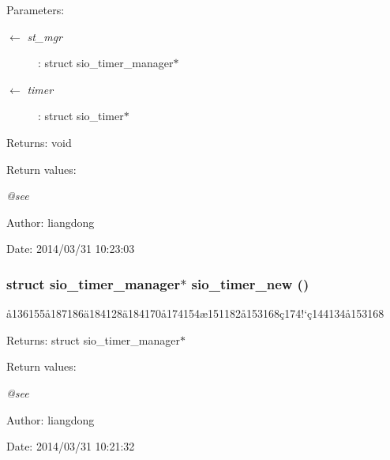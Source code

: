 \begin{Desc}
\item[Parameters:]
\begin{description}
\item[\mbox{$\leftarrow$} {\em st\_\-mgr}]: struct sio\_\-timer\_\-manager$\ast$ \item[\mbox{$\leftarrow$} {\em timer}]: struct sio\_\-timer$\ast$ \end{description}
\end{Desc}
\begin{Desc}
\item[Returns:]void \end{Desc}
\begin{Desc}
\item[Return values:]
\begin{description}
\item[{\em @see}]\end{description}
\end{Desc}
\begin{Desc}
\item[Author:]liangdong \end{Desc}
\begin{Desc}
\item[Date:]2014/03/31 10:23:03 \end{Desc}
\subsubsection{\setlength{\rightskip}{0pt plus 5cm}struct sio\_\-timer\_\-manager$\ast$ sio\_\-timer\_\-new ()}\label{sio__timer_8h_a1}


\aa{}136155\aa{}187186\"{a}184128\"{a}184170\aa{}174154\ae{}151182\aa{}153168\c{c}174!`\c{c}144134\aa{}153168 

\begin{Desc}
\item[Returns:]struct sio\_\-timer\_\-manager$\ast$ \end{Desc}
\begin{Desc}
\item[Return values:]
\begin{description}
\item[{\em @see}]\end{description}
\end{Desc}
\begin{Desc}
\item[Author:]liangdong \end{Desc}
\begin{Desc}
\item[Date:]2014/03/31 10:21:32 \end{Desc}
